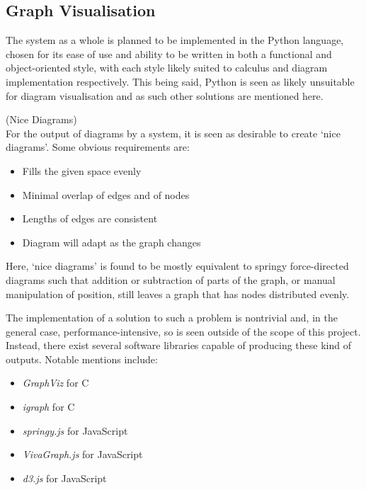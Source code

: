 \subsection{Graph Visualisation}

    The system as a whole is planned to be implemented in the Python language, chosen for its ease of use and ability to be written in both a functional and object-oriented style, with each style likely suited to calculus and diagram implementation respectively.
    This being said, Python is seen as likely unsuitable for diagram visualisation and as such other solutions are mentioned here.\\
    
    \begin{definition*}{(Nice Diagrams)\\}
        For the output of diagrams by a system, it is seen as desirable to create `nice diagrams'.
        Some obvious requirements are:
        \begin{itemize}
            \item Fills the given space evenly
            \item Minimal overlap of edges and of nodes
            \item Lengths of edges are consistent
            \item Diagram will adapt as the graph changes
        \end{itemize}
        Here, `nice diagrams' is found to be mostly equivalent to springy force-directed diagrams such that addition or subtraction of parts of the graph, or manual manipulation of position, still leaves a graph that has nodes distributed evenly.
    \end{definition*}


    \begin{examples}
        The implementation of a solution to such a problem is nontrivial and, in the general case, performance-intensive, so is seen outside of the scope of this project.
        Instead, there exist several software libraries capable of producing these kind of outputs.
        Notable mentions include:
        \begin{itemize}
            \item \textit{GraphViz} for C~\footnotemark
            \item \textit{igraph} for C~\addtocounter{footnote}{-1}\footnotemark
            \item \textit{springy.js} for JavaScript
            \item \textit{VivaGraph.js} for JavaScript
            \item \textit{d3.js} for JavaScript
        \end{itemize}
    \end{examples}


